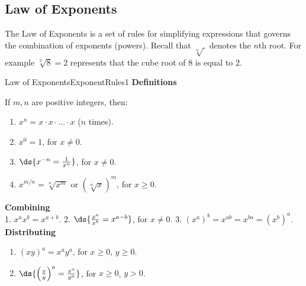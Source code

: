 \subsection{Law of Exponents}
The Law of Exponents is a set of rules for simplifying expressions that governs 
the combination of exponents (powers).
Recall that $\sqrt[n]{~}$ denotes the $n$th root. 
For example $\sqrt[3]{8}=2$ represents that the cube root of $8$ is equal to $2$.\\

\begin{definition}{Law of Exponents}{ExponentRules1}
{\bf Definitions}

If $m,n$ are positive integers, then:
\begin{multicols}{2}
\begin{enumerate}
	\item $x^n=x\cdot x\cdot\ldots\cdot x$ ($n$ times).
	\item $x^0=1$, for $x\neq 0$.
	\item $\ds{x^{-n}=\frac{1}{x^n}}$, for $x\neq 0$.
	\item $x^{m/n}=\sqrt[n]{x^m}$ or $\left(\sqrt[n]{x}\right)^m$, for $x\geq 0$.
\end{enumerate}
\end{multicols}

{\bf Combining}\\

\hspace{4mm} 1. \hspace{1mm} $x^ax^b=x^{a+b}$.
\hspace{0.5cm} 2. \hspace{1mm}  $\ds{\frac{x^a}{x^b}=x^{a-b}}$, for $x\neq 0$.
\hspace{0.5cm} 3. \hspace{1mm}  $\left(x^a\right)^b=x^{ab}=x^{ba}=\left(x^b\right)^a$. \\


{\bf Distributing}
\begin{multicols}{2}
\begin{enumerate}
	\item $(xy)^a=x^ay^a$, for $x\geq 0$, $y\geq 0$.
	\item $\ds{\left(\frac{x}{y}\right)^a=\frac{x^a}{y^a}}$, for $x\geq 0$, $y>0$.
\end{enumerate}
\end{multicols}
\end{definition}

